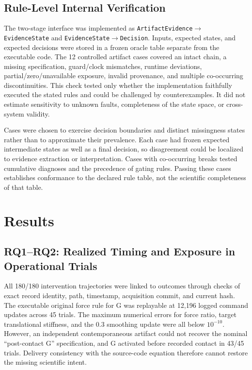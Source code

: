 \documentclass[journal]{IEEEtran}
\begin{document}
\subsection{Rule-Level Internal Verification}

The two-stage interface was implemented as
\texttt{ArtifactEvidence}$\rightarrow$\texttt{EvidenceState} and
\texttt{EvidenceState}$\rightarrow$\texttt{Decision}. Inputs, expected states,
and expected decisions were stored in a frozen oracle table separate from the
executable code. The 12 controlled artifact cases covered an intact chain, a
missing specification, guard/clock mismatches, runtime deviations,
partial/zero/unavailable exposure, invalid provenance, and multiple
co-occurring discontinuities. This check tested only whether the implementation
faithfully executed the stated rules and could be challenged by
counterexamples. It did not estimate sensitivity to unknown faults,
completeness of the state space, or cross-system validity.

Cases were chosen to exercise decision boundaries and distinct missingness
states rather than to approximate their prevalence. Each case had frozen
expected intermediate states as well as a final decision, so disagreement
could be localized to evidence extraction or interpretation. Cases with
co-occurring breaks tested cumulative diagnoses and the precedence of gating
rules. Passing these cases establishes conformance to the declared rule table,
not the scientific completeness of that table.

\section{Results}

\subsection{RQ1--RQ2: Realized Timing and Exposure in Operational Trials}

All 180/180 intervention trajectories were linked to outcomes through checks
of exact record identity, path, timestamp, acquisition commit, and current
hash. The executable original force rule for G was replayable at 12,196 logged
command updates across 45 trials. The maximum numerical errors for force
ratio, target translational stiffness, and the 0.3 smoothing update were all
below $10^{-10}$. However, an independent contemporaneous artifact could not
recover the nominal ``post-contact G'' specification, and G activated before
recorded contact in 43/45 trials. Delivery consistency with the source-code
equation therefore cannot restore the missing scientific intent.
\end{document}
